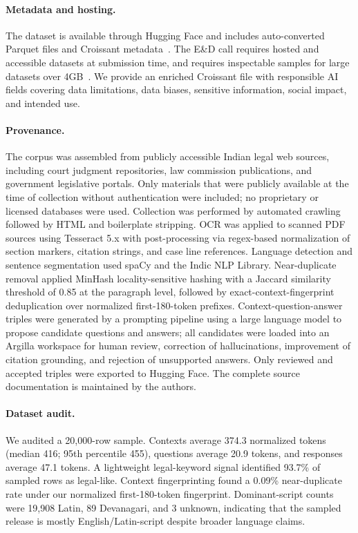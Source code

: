 \documentclass{article}
\begin{document}
\paragraph{Metadata and hosting.}
The dataset is available through Hugging Face and includes auto-converted Parquet files and Croissant metadata~\citep{croissant}. The E\&D call requires hosted and accessible datasets at submission time, and requires inspectable samples for large datasets over 4GB~\citep{neurips2026edcfp}. We provide an enriched Croissant file with responsible AI fields covering data limitations, data biases, sensitive information, social impact, and intended use.

\paragraph{Provenance.}
The corpus was assembled from publicly accessible Indian legal web sources, including court judgment repositories, law commission publications, and government legislative portals. Only materials that were publicly available at the time of collection without authentication were included; no proprietary or licensed databases were used. Collection was performed by automated crawling followed by HTML and boilerplate stripping. OCR was applied to scanned PDF sources using Tesseract 5.x with post-processing via regex-based normalization of section markers, citation strings, and case line references. Language detection and sentence segmentation used spaCy and the Indic NLP Library. Near-duplicate removal applied MinHash locality-sensitive hashing with a Jaccard similarity threshold of 0.85 at the paragraph level, followed by exact-context-fingerprint deduplication over normalized first-180-token prefixes. Context-question-answer triples were generated by a prompting pipeline using a large language model to propose candidate questions and answers; all candidates were loaded into an Argilla workspace for human review, correction of hallucinations, improvement of citation grounding, and rejection of unsupported answers. Only reviewed and accepted triples were exported to Hugging Face. The complete source documentation is maintained by the authors.

\paragraph{Dataset audit.}
We audited a 20,000-row sample. Contexts average 374.3 normalized tokens (median 416; 95th percentile 455), questions average 20.9 tokens, and responses average 47.1 tokens. A lightweight legal-keyword signal identified 93.7\% of sampled rows as legal-like. Context fingerprinting found a 0.09\% near-duplicate rate under our normalized first-180-token fingerprint. Dominant-script counts were 19,908 Latin, 89 Devanagari, and 3 unknown, indicating that the sampled release is mostly English/Latin-script despite broader language claims.
\end{document}
